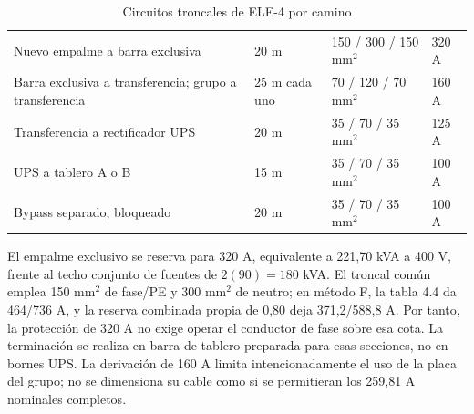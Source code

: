 \begin{table}[htbp]
\centering\small
\caption{Circuitos troncales de ELE-4 por camino}\label{tab:sd4-ele4-troncales}
\begin{tabularx}{\linewidth}{X R{16mm} L{31mm} R{16mm}}
\hline
{} &  &  &  \\ \hline
Nuevo empalme a barra exclusiva & 20 m & 150 / 300 / 150 mm$^2$ & 320 A \\ \hline
Barra exclusiva a transferencia; grupo a transferencia & 25 m cada uno & 70 / 120 / 70 mm$^2$ & 160 A \\ \hline
Transferencia a rectificador UPS & 20 m & 35 / 70 / 35 mm$^2$ & 125 A \\ \hline
UPS a tablero A o B & 15 m & 35 / 70 / 35 mm$^2$ & 100 A \\ \hline
Bypass separado, bloqueado & 20 m & 35 / 70 / 35 mm$^2$ & 100 A \\ \hline
\end{tabularx}
\end{table}

El empalme exclusivo se reserva para 320 A, equivalente a 221,70 kVA a 400 V, frente al techo conjunto de fuentes de $2(90)=180$ kVA. El troncal común emplea 150 mm$^2$ de fase/PE y 300 mm$^2$ de neutro; en método F, la tabla 4.4 da 464/736 A, y la reserva combinada propia de 0,80 deja 371,2/588,8 A. Por tanto, la protección de 320 A no exige operar el conductor de fase sobre esa cota. La terminación se realiza en barra de tablero preparada para esas secciones, no en bornes UPS. La derivación de 160 A limita intencionadamente el uso de la placa del grupo; no se dimensiona su cable como si se permitieran los 259,81 A nominales completos.

